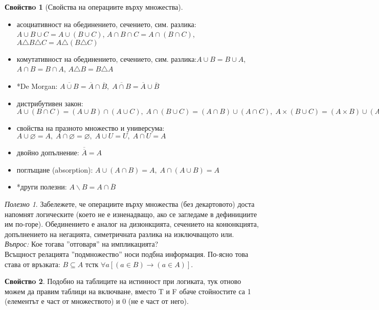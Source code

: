 \documentclass[10pt, a4paper]{article}
\theoremstyle{definition}
\newtheorem{prop}{Свойствo}[section]
\theoremstyle{remark}
\newtheorem*{tip}{Полезно}
\begin{document}
\hfill
\begin{prop}[Свойства на операциите върху множества]\hfill
    \begin{itemize}
        \item асоциативност на обединението, сечението, сим. разлика: \(A\cup B\cup C= A\cup (B\cup C)\), \(A\cap B\cap C= A\cap (B\cap C)\), \(A\triangle B\triangle C= A\triangle (B\triangle C)\)
        \item комутативност на обединението, сечението, сим. разлика:\(A\cup B=B\cup A\), \(A\cap B=B\cap A\), \(A\triangle B=B\triangle A\)
        \item *De Morgan: \(\overline{A\cup B}=\overline{A}\cap \overline{B},
        \;\overline{A\cap B}=\overline{A}\cup \overline{B}\)
        \item дистрибутивен закон: \(A\cup(B\cap C)=(A\cup B)\cap(A\cup C),\; A\cap(B\cup C)=(A\cap B)\cup(A\cap C),\; A\times (B\cup C)=(A\times B)\cup(A\times C)\)
        \item свойства на празното множество и универсума: \(A\cup\varnothing=A,\; A\cap\varnothing=\varnothing,\; A\cup U=U,\; A\cap U=A\)
        \item двойно допълнение: \(\overline{\overline{A}}=A\)
        \item поглъщане (absorption): \(A\cup(A\cap B)=A,\;A\cap(A\cup B)=A\)
        \item *други полезни: \(A\backslash B=A\cap\overline{B}\)
    \end{itemize}
    \begin{tip}
        Забележете, че операциите върху множества (без декартовото) доста напомнят логическите (което не е изненадващо, ако се загледаме в дефинициите им по-горе). Обединението е аналог на дизюнкцията, сечението на конюнкцията, допълнението на негацията, симетричната разлика на изключващото или.\\\emph{Въпрос:} Кое тогава ''отговаря'' на импликацията?
        \\Всъщност релацията ''подмножество'' носи подбна информация. По-ясно това става от връзката: \(B\subseteq A\) тстк \(\forall a[(a\in B)\rightarrow (a\in A)]\).
    \end{tip}
\end{prop}

\hfill
\begin{prop}
    Подобно на таблиците на истинност при логиката, тук отново можем да правим таблици на включване, вместо T и F обаче стойностите са 1 (елементът е част от множеството) и 0 (не е част от него).
\end{prop}
\end{document}
